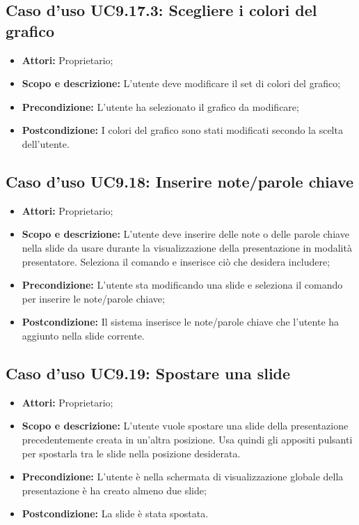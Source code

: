 		\subsection{Caso d'uso UC9.17.3: Scegliere i colori del grafico}
		\begin{itemize}
			\item \textbf{Attori:} Proprietario;
			\item \textbf{Scopo e descrizione:} L'utente deve modificare il set di colori del grafico;
			\item \textbf{Precondizione:} L'utente ha selezionato il grafico da modificare;
			\item \textbf{Postcondizione:} I colori del grafico sono stati modificati secondo la scelta dell'utente.
		\end{itemize}


\subsection{Caso d'uso UC9.18: Inserire note/parole chiave}
\begin{itemize}
	\item \textbf{Attori:} Proprietario;
	\item \textbf{Scopo e descrizione:} L'utente deve inserire delle note o delle parole chiave nella \gls{slide} da usare durante la visualizzazione della presentazione in modalità presentatore. Seleziona il comando e inserisce ciò che desidera includere;
	\item \textbf{Precondizione:} L'utente sta modificando una \gls{slide} e seleziona il comando per inserire le note/parole chiave;
	\item \textbf{Postcondizione:} Il sistema inserisce le note/parole chiave che l'utente ha aggiunto nella \gls{slide} corrente.
\end{itemize}

\subsection{Caso d'uso UC9.19: Spostare una slide}
\begin{itemize}
	\item \textbf{Attori:} Proprietario;
	\item \textbf{Scopo e descrizione:} L'utente vuole spostare una \gls{slide} della presentazione precedentemente creata in un'altra posizione. Usa quindi gli appositi pulsanti per spostarla tra le slide nella posizione desiderata.
	\item \textbf{Precondizione:} L'utente è nella schermata di visualizzazione globale della presentazione è ha creato almeno due slide;
	\item \textbf{Postcondizione:} La \gls{slide} è stata spostata.
\end{itemize}
